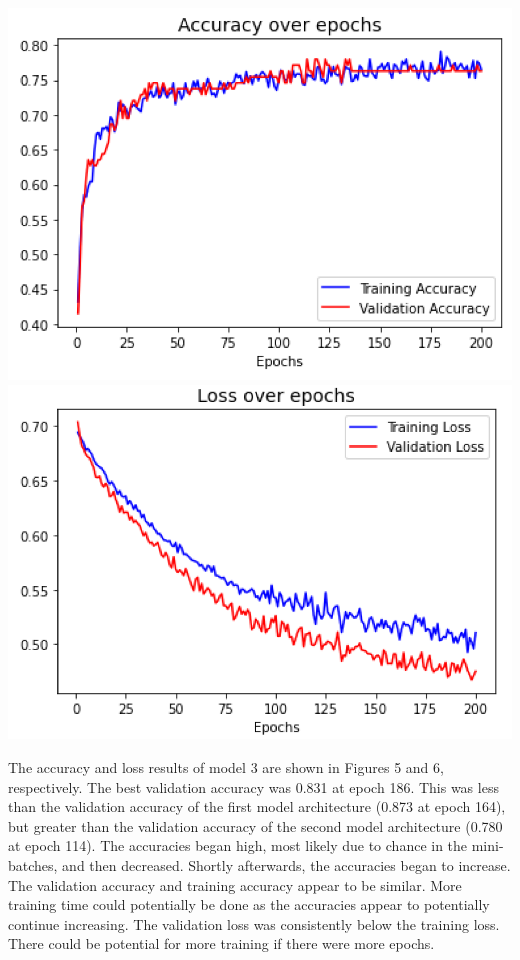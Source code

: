 \documentclass[10pt]{article}
\begin{document}
\begin{multicols}{2}
\begin{center}
\includegraphics[width=.4\textwidth]{Model2Acc}
\includegraphics[width=.4\textwidth]{Model2Loss}
\end{center}

The accuracy and loss results of model 3 are shown in Figures 5 and 6, respectively. The best validation accuracy was 0.831 at epoch 186. This was less than the validation accuracy of the first model architecture (0.873 at epoch 164), but greater than the validation accuracy of the second model architecture (0.780 at epoch 114). The accuracies began high, most likely due to chance in the mini-batches, and then decreased. Shortly afterwards, the accuracies began to increase. The validation accuracy and training accuracy appear to be similar. More training time could potentially be done as the accuracies appear to potentially continue increasing. The validation loss was consistently below the training loss. There could be potential for more training if there were more epochs.


\end{multicols}
\end{document}
